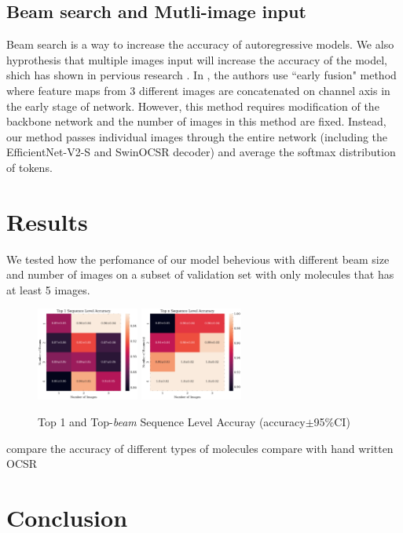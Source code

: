 \documentclass{article}
\begin{document}
\subsection{Beam search and Mutli-image input}
Beam search is a way to increase the accuracy of autoregressive models. \cite{yang_breaking_2018} \cite{zhang_beam_2024} 
We also hyprothesis that multiple images input will increase the accuracy of the model, shich has shown in pervious research \cite{sun_multi-input_2017}. In \cite{sun_multi-input_2017}, the authors use ``early fusion" method where feature maps from 3 different images are concatenated on channel axis in the early stage of network. However, this method requires modification of the backbone network and the number of images in this method are fixed. Instead, our method passes individual images through the entire network (including the EfficientNet-V2-S and SwinOCSR decoder) and average the softmax distribution of tokens.  
\section{Results}
We tested how the perfomance of our model behevious with different beam size and number of images on a subset of validation set with only molecules that has at least 5 images. 
\begin{figure}
    \centering
    \includegraphics[width=0.3\textwidth]{top1.png}
    \includegraphics[width=0.3\textwidth]{topn.png}
    \caption{Top 1 and Top-\textit{beam} Sequence Level Accuray (accuracy$\pm$95\%CI)}
    \label{fig:res}
\end{figure}


compare the accuracy of different types of molecules
compare with hand written OCSR 
\section{Conclusion}
\end{document}
